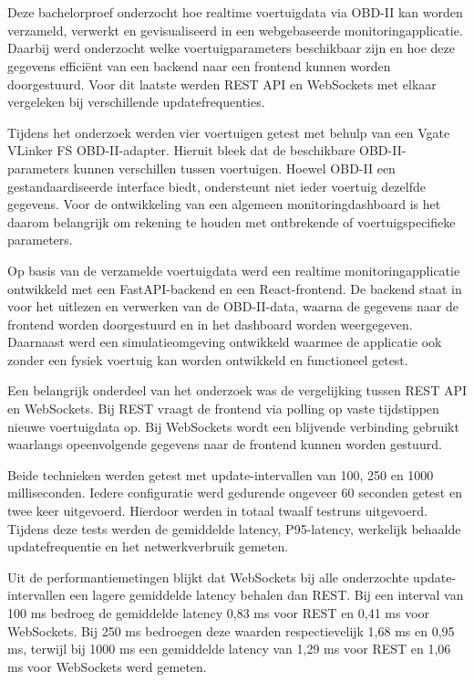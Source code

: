 \chapter{}%
\label{ch:conclusie}
Deze bachelorproef onderzocht hoe realtime voertuigdata via OBD-II kan worden
verzameld, verwerkt en gevisualiseerd in een webgebaseerde monitoringapplicatie.
Daarbij werd onderzocht welke voertuigparameters beschikbaar zijn en hoe deze
gegevens efficiënt van een backend naar een frontend kunnen worden doorgestuurd.
Voor dit laatste werden REST API en WebSockets met elkaar vergeleken bij
verschillende updatefrequenties.

Tijdens het onderzoek werden vier voertuigen getest met behulp van een
Vgate VLinker FS OBD-II-adapter. Hieruit bleek dat de beschikbare
OBD-II-parameters kunnen verschillen tussen voertuigen. Hoewel OBD-II een
gestandaardiseerde interface biedt, ondersteunt niet ieder voertuig dezelfde
gegevens. Voor de ontwikkeling van een algemeen monitoringdashboard is het
daarom belangrijk om rekening te houden met ontbrekende of
voertuigspecifieke parameters.

Op basis van de verzamelde voertuigdata werd een realtime monitoringapplicatie
ontwikkeld met een FastAPI-backend en een React-frontend. De backend staat in
voor het uitlezen en verwerken van de OBD-II-data, waarna de gegevens naar de
frontend worden doorgestuurd en in het dashboard worden weergegeven. Daarnaast
werd een simulatieomgeving ontwikkeld waarmee de applicatie ook zonder een
fysiek voertuig kan worden ontwikkeld en functioneel getest.

Een belangrijk onderdeel van het onderzoek was de vergelijking tussen REST API
en WebSockets. Bij REST vraagt de frontend via polling op vaste tijdstippen
nieuwe voertuigdata op. Bij WebSockets wordt een blijvende verbinding gebruikt
waarlangs opeenvolgende gegevens naar de frontend kunnen worden gestuurd.

Beide technieken werden getest met update-intervallen van 100, 250 en
1000 milliseconden. Iedere configuratie werd gedurende ongeveer 60 seconden
getest en twee keer uitgevoerd. Hierdoor werden in totaal twaalf testruns
uitgevoerd. Tijdens deze tests werden de gemiddelde latency, P95-latency,
werkelijk behaalde updatefrequentie en het netwerkverbruik gemeten.

Uit de performantiemetingen blijkt dat WebSockets bij alle onderzochte
update-intervallen een lagere gemiddelde latency behalen dan REST. Bij een
interval van 100 ms bedroeg de gemiddelde latency 0,83 ms voor REST en
0,41 ms voor WebSockets. Bij 250 ms bedroegen deze waarden respectievelijk
1,68 ms en 0,95 ms, terwijl bij 1000 ms een gemiddelde latency van 1,29 ms
voor REST en 1,06 ms voor WebSockets werd gemeten.

